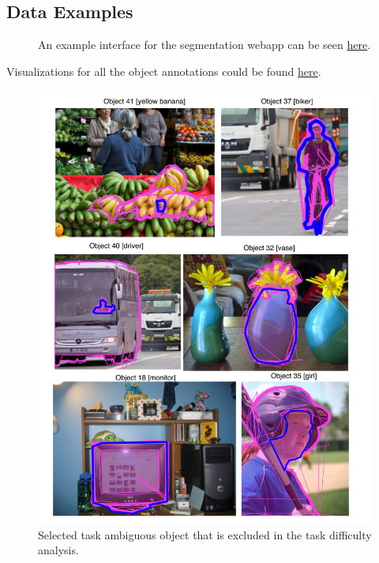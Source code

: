 \documentclass[12pt]{article}
\begin{document}
\begin{appendices}
\newpage
\section{Data Examples}
\begin{figure}[ht!]
\centering
{}
\caption{An example interface for the segmentation webapp can be seen  \href{http://crowd-segment.herokuapp.com/segment/COCO_train2014_000000000127/10/}{here}.}
\label{interface}
\end{figure}
Visualizations for all the object annotations could be found \href{http://nbviewer.jupyter.org/github/dorisjlee/crowd-seg/blob/master/analysis/2017_01_16_Visualize_all_bb_results.ipynb}{here}.
\begin{figure}[ht!]
\centering
\includegraphics[width=\linewidth]{plots/task_ambiguous_cases.pdf}
\caption{Selected task ambiguous object that is excluded in the task difficulty analysis. }
\end{figure}




\end{appendices}
\end{document}
